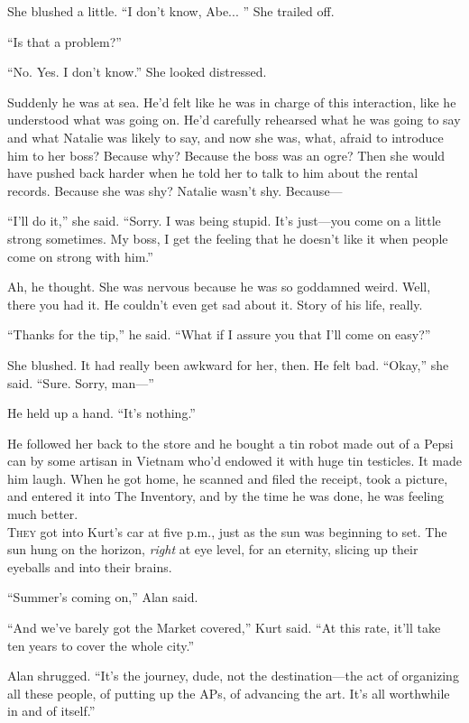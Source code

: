 She blushed a little.  ``I don't know, Abe...  '' She trailed off.

``Is that a problem?''

``No.  Yes.  I don't know.'' She looked distressed.

Suddenly he was at sea.  He'd felt like he was in charge of this
interaction, like he understood what was going on.  He'd carefully
rehearsed what he was going to say and what Natalie was likely to say,
and now she was, what, afraid to introduce him to her boss?  Because
why?  Because the boss was an ogre?  Then she would have pushed back
harder when he told her to talk to him about the rental records. 
Because she was shy?  Natalie wasn't shy.  Because---

``I'll do it,'' she said.  ``Sorry.  I was being stupid.  It's
just---you come on a little strong sometimes.  My boss, I get the
feeling that he doesn't like it when people come on strong with him.''

Ah, he thought.  She was nervous because he was so goddamned weird. 
Well, there you had it.  He couldn't even get sad about it.  Story of
his life, really.

``Thanks for the tip,'' he said.  ``What if I assure you that I'll
come on easy?''

She blushed.  It had really been awkward for her, then.  He felt bad. 
``Okay,'' she said.  ``Sure.  Sorry, man---''

He held up a hand.  ``It's nothing.''

He followed her back to the store and he bought a tin robot made out
of a Pepsi can by some artisan in Vietnam who'd endowed it with huge
tin testicles.  It made him laugh.  When he got home, he scanned and
filed the receipt, took a picture, and entered it into The Inventory,
and by the time he was done, he was feeling much better.
\\
\lettrine[lines=3, lhang=.5, nindent=0pt, findent=2pt]{T}{hey} got into Kurt's car at five p.m., just as the sun was beginning
to set.  The sun hung on the horizon, \textit{right} at eye level, for
an eternity, slicing up their eyeballs and into their brains.

``Summer's coming on,'' Alan said.

``And we've barely got the Market covered,'' Kurt said.  ``At this
rate, it'll take ten years to cover the whole city.''

Alan shrugged.  ``It's the journey, dude, not the destination---the
act of organizing all these people, of putting up the APs, of
advancing the art.  It's all worthwhile in and of itself.''

